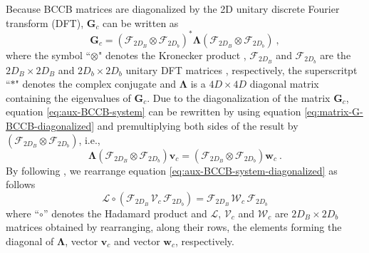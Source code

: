 Because BCCB matrices are diagonalized by the 2D unitary discrete Fourier transform (DFT), 
$\mathbf{G}_{c}$ can be written as
\begin{equation}
	\mathbf{G}_{c} = 
	\left(\boldsymbol{\mathcal{F}}_{2D_{B}} \otimes \boldsymbol{\mathcal{F}}_{2D_{b}} \right)^{\ast} 
	\boldsymbol{\Lambda}
	\left(\boldsymbol{\mathcal{F}}_{2D_{B}} \otimes \boldsymbol{\mathcal{F}}_{2D_{b}} \right) \: ,
	\label{eq:matrix-G-BCCB-diagonalized}
\end{equation}
where the symbol ``$\otimes$" denotes the Kronecker product \cite[e.g.,][p. 243]{horn-johnson1991},
$\boldsymbol{\mathcal{F}}_{2D_{B}}$ and $\boldsymbol{\mathcal{F}}_{2D_{b}}$ are the $2D_{B} \times 2D_{B}$ and $2D_{b} \times 2D_{b}$ 
unitary DFT matrices \citep[e.g.,][ p. 31]{davis1979}, respectively, the superscritpt 
``$\ast$" denotes the complex conjugate and $\boldsymbol{\Lambda}$ is a 
$4D \times 4D$ diagonal matrix containing the eigenvalues of $\mathbf{G}_{c}$.
Due to the diagonalization of the matrix $\mathbf{G}_{c}$, 
equation \ref{eq:aux-BCCB-system} can be rewritten by using equation 
\ref{eq:matrix-G-BCCB-diagonalized} and premultiplying both sides of the result 
by $\left(\boldsymbol{\mathcal{F}}_{2D_{B}} \otimes \boldsymbol{\mathcal{F}}_{2D_{b}} \right)$, i.e.,
\begin{equation}
	\boldsymbol{\Lambda} \left(\boldsymbol{\mathcal{F}}_{2D_{B}} \otimes \boldsymbol{\mathcal{F}}_{2D_{b}} \right) 
	\mathbf{v}_{c} = \left(\boldsymbol{\mathcal{F}}_{2D_{B}} \otimes \boldsymbol{\mathcal{F}}_{2D_{b}} \right) 
	\mathbf{w}_{c} \: .
	\label{eq:aux-BCCB-system-diagonalized}
\end{equation}
By following \citet{takahashi-etal2020}, we rearrange equation \ref{eq:aux-BCCB-system-diagonalized} as follows
\begin{equation}
	\boldsymbol{\mathcal{L}} \circ 
	\left( \boldsymbol{\mathcal{F}}_{2D_{B}} \, \boldsymbol{\mathcal{V}}_{c} \, \boldsymbol{\mathcal{F}}_{2D_{b}} \right) = 
	\boldsymbol{\mathcal{F}}_{2D_{B}} \, \boldsymbol{\mathcal{W}}_{c} \, \boldsymbol{\mathcal{F}}_{2D_{b}}
	\label{eq:aux-BCCB-system-diagonalized-2}
\end{equation}
where ``$\circ$'' denotes the Hadamard product \cite[e.g.,][p. 298]{horn-johnson1991} and 
$\boldsymbol{\mathcal{L}}$, $\boldsymbol{\mathcal{V}}_{c}$ and $\boldsymbol{\mathcal{W}}_{c}$ are 
$2D_{B} \times 2D_{b}$ matrices obtained 
by rearranging, along their rows, the elements forming the diagonal of 
$\boldsymbol{\Lambda}$, vector $\mathbf{v}_{c}$ and vector $\mathbf{w}_{c}$, respectively.
